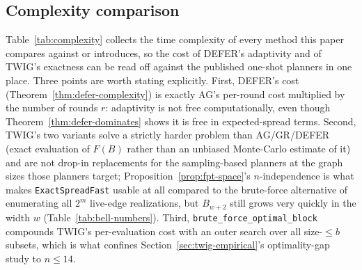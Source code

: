 \documentclass[ASNA,number]{USG}
\newcommand{\FF}{F}
\begin{document}
\subsection{Complexity comparison}\label{sec:complexity-comparison}

Table~\ref{tab:complexity} collects the time complexity of every method
this paper compares against or introduces, so the cost of DEFER's
adaptivity and of TWIG's exactness can be read off against the published
one-shot planners in one place. Three points are worth stating explicitly.
First, DEFER's cost (Theorem~\ref{thm:defer-complexity}) is exactly AG's
per-round cost multiplied by the number of rounds $r$: adaptivity is not
free computationally, even though Theorem~\ref{thm:defer-dominates} shows
it is free in expected-spread terms. Second, TWIG's two variants solve a
strictly harder problem than AG/GR/DEFER (exact evaluation of $\FF(B)$
rather than an unbiased Monte-Carlo estimate of it) and are not drop-in
replacements for the sampling-based planners at the graph sizes those
planners target; Proposition~\ref{prop:fpt-space}'s
$n$-independence is what makes \texttt{ExactSpreadFast} usable at all
compared to the brute-force alternative of enumerating all $2^m$ live-edge
realizations, but $B_{w+2}$ still grows very quickly in the width $w$
(Table~\ref{tab:bell-numbers}). Third, \texttt{brute\_force\_optimal\_block}
compounds TWIG's per-evaluation cost with an outer search over all
size-$\le b$ subsets, which is what confines
Section~\ref{sec:twig-empirical}'s optimality-gap study to $n\le14$.
\end{document}
